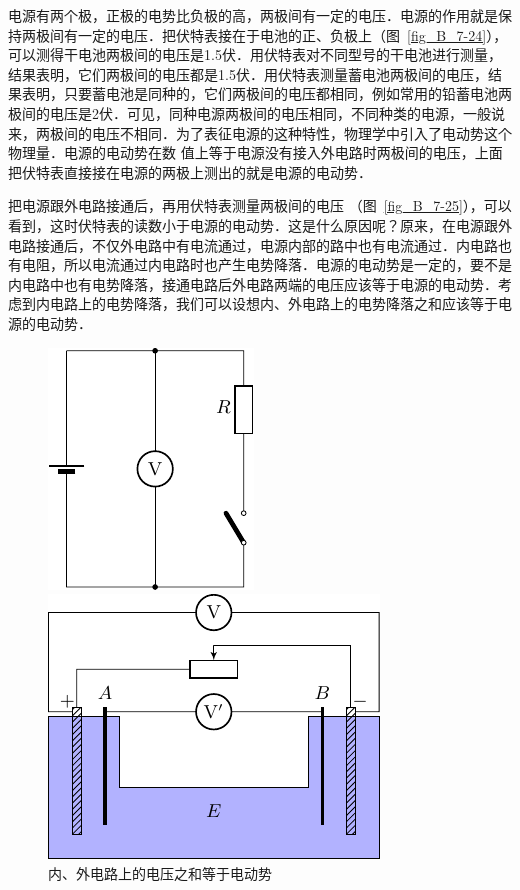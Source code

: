 电源有两个极，正极的电势比负极的高，两极间有一定的电压．电源的作用就是保持两极间有一定的电压．把伏特表接在于电池的正、负极上（图~\ref{fig_B_7-24}），可以测得干电池两极间的电压是1.5伏．用伏特表对不同型号的干电池进行测量，结果表明，它们两极间的电压都是1.5伏．用伏特表测量蓄电池两极间的电压，结果表明，只要蓄电池是同种的，它们两极间的电压都相同，例如常用的铅蓄电池两极间的电压是2伏．可见，同种电源两极间的电压相同，不同种类的电源，一般说来，两极间的电压不相同．为了表征电源的这种特性，物理学中引入了电动势这个物理量．电源的电动势在数
值上等于电源没有接入外电路时两极间的电压，上面把伏特表直接接在电源的两极上测出的就是电源的电动势．

把电源跟外电路接通后，再用伏特表测量两极间的电压
（图~\ref{fig_B_7-25}），可以看到，这时伏特表的读数小于电源的电动势．这是什么原因呢？原来，在电源跟外电路接通后，不仅外电路中有电流通过，电源内部的路中也有电流通过．内电路也有电阻，所以电流通过内电路时也产生电势降落．电源的电动势是一定的，要不是内电路中也有电势降落，接通电路后外电路两端的电压应该等于电源的电动势．考虑到内电路上的电势降落，我们可以设想内、外电路上的电势降落之和应该等于电源的电动势．
\begin{figure}[htbp]
    \centering
    \begin{minipage}[t]{0.4\textwidth}
        \centering
        \includegraphics{fig/B/7-25.pdf}
        \caption{}\label{fig_B_7-25}
    \end{minipage}
    \hfil
    \begin{minipage}[t]{0.53\textwidth}
        \centering
        \includegraphics{fig/B/7-26.pdf}
        \caption{内、外电路上的电压之和等于电动势}\label{fig_B_7-26}
    \end{minipage}
\end{figure}

